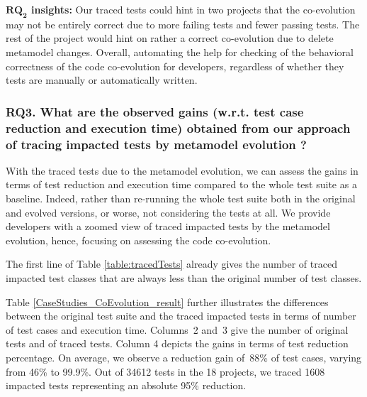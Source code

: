 \begin{table}[t]
{\begin{tabular}{
			@{\hskip3pt}c@{\hskip3pt}|c@{\hskip3pt}|c@{\hskip3pt}|c@{\hskip3pt}|c@{\hskip3pt}|c@{\hskip3pt}|c@{\hskip3pt}|c@{\hskip3pt}|| c@{\hskip3pt} |c@{\hskip3pt} }
		
		\bottomrule
	\end{tabular}
}
\end{table}

\begin{tcolorbox}[boxsep=-2pt]
\textbf{$\boldsymbol{RQ_2}$ insights:}
Our traced tests could hint in two projects that the co-evolution may not be entirely correct due to more failing tests and fewer passing tests. The rest of the project would hint on rather a correct co-evolution due to delete metamodel changes. Overall, automating the help for checking of the behavioral correctness of the code co-evolution for developers, regardless of whether they tests are manually or automatically written.  
\end{tcolorbox}



\subsubsection{RQ3. What are the observed gains (w.r.t. test case reduction and execution time) obtained from our approach of tracing impacted tests by metamodel evolution ?}
With the traced tests due to the metamodel evolution, we can assess the gains in terms of test reduction and execution time compared to the whole test suite as a baseline. 
Indeed, rather than re-running the whole test suite both in the original and evolved versions, or worse, not considering the tests at all. We provide developers with a zoomed view of traced impacted tests by the metamodel evolution, hence, focusing on assessing the code co-evolution.  

The first line of Table \ref{table:tracedTests} already gives the number of traced impacted test classes that are always less than the original number of test classes. 

Table \ref{CaseStudies_CoEvolution_result} further illustrates the differences between the original test suite and the traced impacted tests in terms of number of test cases and execution time. Columns~2 and~3 give the number of original tests and of traced tests.
%
Column 4 depicts the gains in terms of test reduction percentage. On average, we observe a reduction gain of~88\% of test cases, varying from 46\% to 99.9\%. Out of 34612 tests in the 18 projects, we traced 1608 impacted tests representing an absolute 95\% reduction.

